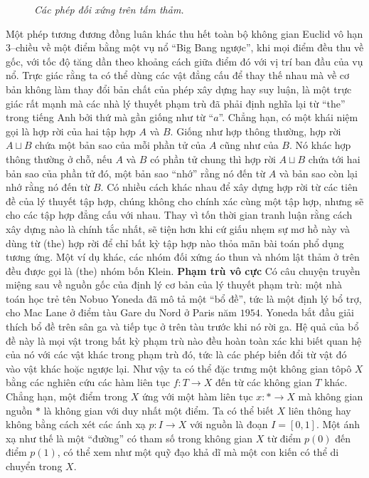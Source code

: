 \begin{multicols}{2}
\begin{figure}[H]
		\caption{\small\textit{\color{duongvaotoanhoc}Các phép đối xứng trên tấm thảm.}}
		\vspace*{-10pt}
	\end{figure}
	Một phép tương đương đồng luân khác thu hết toàn bộ không gian Euclid vô hạn $3$--chiều về một điểm bằng một vụ nổ ``Big Bang ngược'', khi mọi điểm đều thu về gốc, với tốc độ tăng dần theo khoảng cách giữa điểm đó với vị trí ban đầu của vụ nổ. 
	\vskip 0.1cm
	Trực giác rằng ta có thể dùng các vật đẳng cấu để thay thế nhau mà về cơ bản không làm thay đổi bản chất của phép xây dựng hay suy luận, là một trực giác rất mạnh mà các nhà lý thuyết phạm trù đã phải định nghĩa lại từ ``the'' trong tiếng Anh bởi thứ mà gần giống như từ ``$a$''. Chẳng hạn, có một khái niệm gọi là hợp rời của hai tập hợp $A$ và $B$. Giống như hợp thông thường, hợp rời $A \sqcup B$ chứa một bản sao của mỗi phần tử của $A$ cũng như của $B$. Nó khác hợp thông thường ở chỗ, nếu $A$ và $B$ có phần tử chung thì hợp rời $A \sqcup B$ chứa tới hai bản sao của phần tử đó, một bản sao ``nhớ'' rằng nó đến từ $A$ và bản sao còn lại nhớ rằng nó đến từ $B$.
	\vskip 0.1cm
	Có nhiều cách khác nhau để xây dựng hợp rời từ các tiên đề của lý thuyết tập hợp, chúng không cho chính xác cùng một tập hợp, nhưng sẽ cho các tập hợp đẳng cấu với nhau. Thay vì tốn thời gian tranh luận rằng cách xây dựng nào là chính tắc nhất, sẽ tiện hơn khi cứ giấu nhẹm sự mơ hồ này và dùng từ (the) hợp rời để chỉ bất kỳ tập hợp nào thỏa mãn bài toán phổ dụng tương ứng. Một ví dụ khác, các nhóm đối xứng áo thun và nhóm lật thảm ở trên đều được gọi là (the) nhóm bốn Klein.
	\vskip 0.1cm
	\textbf{\color{duongvaotoanhoc}Phạm trù vô cực}
	\vskip 0.1cm
	Có câu chuyện truyền miệng sau về nguồn gốc của định lý cơ bản của lý thuyết phạm trù: một nhà toán học trẻ tên Nobuo Yoneda đã mô tả một ``bổ đề'', tức là một định lý bổ trợ, cho Mac Lane ở điểm tàu Gare du Nord ở Paris năm $1954$. Yoneda bắt đầu giải thích bổ đề trên sân ga và tiếp tục ở trên tàu trước khi nó rời ga. Hệ quả của bổ đề này là mọi vật trong bất kỳ phạm trù nào đều hoàn toàn xác khi biết quan hệ của nó với các vật khác trong phạm trù đó, tức là các phép biến đổi từ vật đó vào vật khác hoặc ngược lại. Như vậy ta có thể đặc trưng một không gian tôpô $X$ bằng các nghiên cứu các hàm liên tục $f: T \to X$ đến từ các không gian $T$ khác. Chẳng hạn, một điểm trong $X$ ứng với một hàm liên tục $x: \ast \to X$ mà không gian nguồn $\ast$ là không gian với duy nhất một điểm. Ta có thể biết $X$ liên thông hay không bằng cách xét các ánh xạ $p: I \to X$ với nguồn là đoạn $I = [0,1]$. Một ánh xạ như thế là một ``đường'' có tham số trong không gian $X$ từ điểm $p(0)$ đến điểm $p(1)$, có thể xem như một quỹ đạo khả dĩ mà một con kiến có thể di chuyển trong $X$.

\end{multicols}
